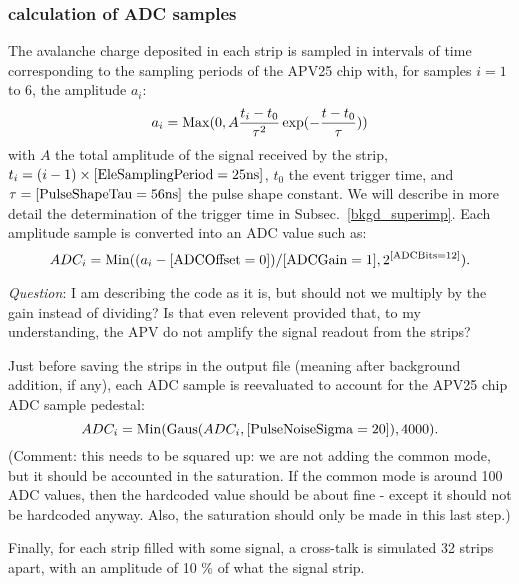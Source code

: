 \subsubsection{calculation of ADC samples}
\label{adc_samp}

The avalanche charge deposited in each strip is sampled in intervals of time corresponding to the sampling periods of the APV25 chip  with, for samples $i = 1$ to 6, the amplitude $a_i$:
%
\begin{equation}
  a_i = {\rm Max}(0, A \frac{t_i-t_0}{\tau^2} \exp(-\frac{t-t_0}{\tau}) )
  \label{pulseshape_eq}
\end{equation}
%
with $A$ the total amplitude of the signal received by the strip, $t_i = (i-1) \times [{\rm EleSamplingPeriod} = 25 {\rm ns}]$, $t_0$ the event trigger time, and $\tau = [{\rm PulseShapeTau} = 56 {\rm ns}]$ the pulse shape constant.
We will describe in more detail the determination of the trigger time in Subsec.~\ref{bkgd_superimp}.
Each amplitude sample is converted into an ADC value such as:
%
\begin{equation}
  ADC_i = {\rm Min}((a_i-[{\rm ADCOffset} = 0])/[{\rm ADCGain} = 1], 2^{[{\rm ADCBits} = 12]}).
\end{equation}
%
\begin{myindentpar}{2.5cm}
{\it Question}: I am describing the code as it is, but should not we multiply by the gain instead of dividing? Is that even relevent provided that, to my understanding, the APV do not amplify the signal readout from the strips?
\end{myindentpar}
Just before saving the strips in the output file (meaning after background addition, if any), each ADC sample is reevaluated to account for the APV25 chip ADC sample pedestal:
%
\begin{equation}
  ADC_i = {\rm Min}({\rm Gaus}(ADC_i, [{\rm PulseNoiseSigma} = 20]) , 4000).
\end{equation}
%
(Comment: this needs to be squared up: we are not adding the common mode, but it should be accounted in the saturation. If the common mode is around 100 ADC values, then the hardcoded value should be about fine - except it should not be hardcoded anyway. Also, the saturation should only be made in this last step.)

Finally, for each strip filled with some signal, a cross-talk is simulated 32 strips apart, with an amplitude of 10 \% of what the signal strip.

